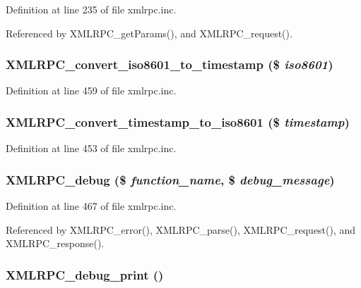 Definition at line 235 of file xmlrpc.inc.

Referenced by XMLRPC\_\-getParams(), and XMLRPC\_\-request().\hypertarget{xmlrpc_8inc_1d9c2ef61c9f1fd2723d06d1364ef845}{
\subsubsection{\setlength{\rightskip}{0pt plus 5cm}XMLRPC\_\-convert\_\-iso8601\_\-to\_\-timestamp (\$ {\em iso8601})}}
\label{xmlrpc_8inc_1d9c2ef61c9f1fd2723d06d1364ef845}




Definition at line 459 of file xmlrpc.inc.\hypertarget{xmlrpc_8inc_4485d809c5d598949d9cfaca42bddf37}{
\subsubsection{\setlength{\rightskip}{0pt plus 5cm}XMLRPC\_\-convert\_\-timestamp\_\-to\_\-iso8601 (\$ {\em timestamp})}}
\label{xmlrpc_8inc_4485d809c5d598949d9cfaca42bddf37}




Definition at line 453 of file xmlrpc.inc.\hypertarget{xmlrpc_8inc_e2d2e97a8c1c560f5e96d58d60a02874}{
\subsubsection{\setlength{\rightskip}{0pt plus 5cm}XMLRPC\_\-debug (\$ {\em function\_\-name}, \$ {\em debug\_\-message})}}
\label{xmlrpc_8inc_e2d2e97a8c1c560f5e96d58d60a02874}




Definition at line 467 of file xmlrpc.inc.

Referenced by XMLRPC\_\-error(), XMLRPC\_\-parse(), XMLRPC\_\-request(), and XMLRPC\_\-response().\hypertarget{xmlrpc_8inc_8467f85edd385ddf2506b1bd5065a6d7}{
\subsubsection{\setlength{\rightskip}{0pt plus 5cm}XMLRPC\_\-debug\_\-print ()}}
\label{xmlrpc_8inc_8467f85edd385ddf2506b1bd5065a6d7}




